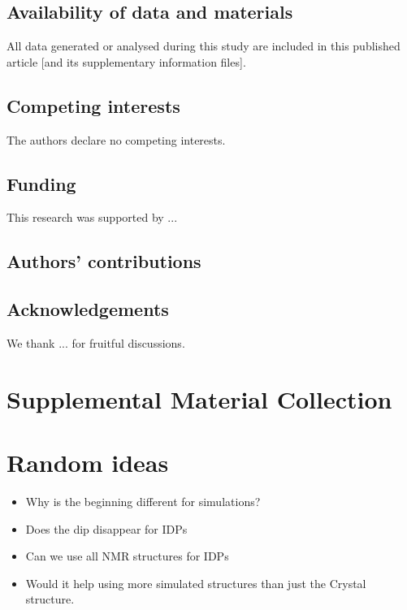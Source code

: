 \documentclass[reprint,amsmath,amssymb,rmp,onecolumn,notitlepage,11pt]{revtex4-1}
\begin{document}
\subsection{Availability of data and materials}
All data generated or analysed during this study are included in this published article [and its supplementary information files].
\subsection{Competing interests}
The authors declare no competing interests.
\subsection{Funding}
This research was supported by ...
\subsection{Authors' contributions}

\subsection{Acknowledgements}
We thank ... for fruitful discussions.




\appendix
\section{Supplemental Material Collection}
\section{Random ideas}
\begin{itemize}
    \item Why is the beginning different for simulations?
    \item Does the dip disappear for IDPs
    \item Can we use all NMR structures for IDPs
    \item Would it help using more simulated structures than just the Crystal structure. 
\end{itemize}
\end{document}
